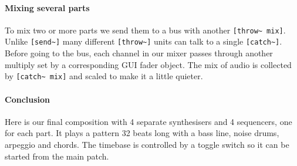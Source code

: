 \paragraph{Mixing several parts}
To mix two or more parts we send them to a bus with
another \verb+[throw~ mix]+. Unlike \verb+[send~]+ many different \verb+[throw~]+
units can talk to a single \verb+[catch~]+. Before going to the
bus, each channel in our mixer passes through another multiply 
set by a corresponding GUI fader object. The mix of audio is collected by 
\verb+[catch~ mix]+ and scaled to make it a little quieter.

\paragraph{Conclusion}
Here is our final composition with 4 separate synthesisers and 4 sequencers, one for each part.
It plays a pattern 32 beats long with a bass line, noise drums, arpeggio and chords.
The timebase is controlled by a toggle switch so it can be started from the main patch.